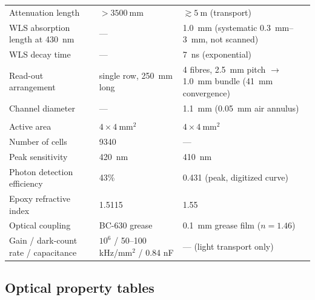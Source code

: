 \documentclass[11pt,a4paper]{article}
\begin{document}
\begin{table}[H]
\begin{tabularx}{\textwidth}{@{}>{\raggedright\arraybackslash}p{} L L@{}}
Attenuation length & $>\SI{3500}{\milli\meter}$ & $\gtrsim\SI{5}{\meter}$ (transport) \\
WLS absorption length at \SI{430}{\nano\meter} & --- & \SI{1.0}{\milli\meter} (systematic \SIrange{0.3}{3}{\milli\meter}, not scanned) \\
WLS decay time & --- & \SI{7}{\nano\second} (exponential) \\
Read-out arrangement & single row, \SI{250}{\milli\meter} long & 4 fibres, \SI{2.5}{\milli\meter} pitch $\to$ \SI{1.0}{\milli\meter} bundle (\SI{41}{\milli\meter} convergence) \\
Channel diameter & --- & \SI{1.1}{\milli\meter} (\SI{0.05}{\milli\meter} air annulus) \\
\midrule
{}\\
Active area & $4 \times \SI{4}{\milli\meter\squared}$ & $4 \times \SI{4}{\milli\meter\squared}$ \\
Number of cells & 9340 & --- \\
Peak sensitivity & \SI{420}{\nano\meter} & \SI{410}{\nano\meter} \\
Photon detection efficiency & 43\% & 0.431 (peak, digitized curve) \\
Epoxy refractive index & 1.5115 & 1.55 \\
Optical coupling & BC-630 grease & \SI{0.1}{\milli\meter} grease film ($n=1.46$) \\
Gain / dark-count rate / capacitance & $10^6$ / 50--100 kHz/mm$^2$ / 0.84 nF & --- (light transport only) \\
\bottomrule
\end{tabularx}
\end{table}

\subsection{Optical property tables}
\label{sec:optprops}
\end{document}
